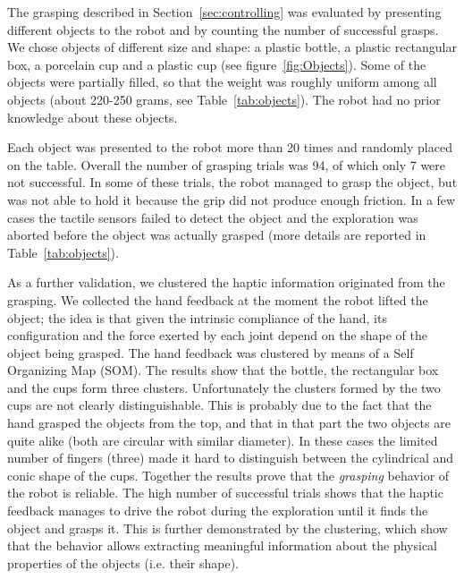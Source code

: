 
The grasping described in Section~\ref{sec:controlling} was
evaluated by presenting different objects to the robot and by
counting the number of successful grasps. We chose objects of
different size and shape: a plastic bottle, a plastic rectangular
box, a porcelain cup and a plastic cup (see
figure~\ref{fig:Objects}). Some of the objects were partially
filled, so that the weight was roughly uniform among all objects
(about 220-250 grams, see Table~\ref{tab:objects}). The robot had
no prior knowledge about these objects.

Each object was presented to the robot more than 20 times and
randomly placed on the table. Overall the number of grasping
trials was 94, of which only 7 were not successful. In some of
these trials, the robot managed to grasp the object, but was not
able to hold it because the grip did not produce enough friction.
In a few cases the tactile sensors failed to detect the object and
the exploration was aborted before the object was actually grasped
(more details are reported in Table~\ref{tab:objects}).

As a further validation, we clustered the haptic information
originated from the grasping. We collected the hand feedback at
the moment the robot lifted the object; the idea is that given the
intrinsic compliance of the hand, its configuration and the force
exerted by each joint depend on the shape of the object being
grasped. The hand feedback was clustered by means of a Self
Organizing Map (SOM). The results show that the bottle, the
rectangular box and the cups form three clusters. Unfortunately
the clusters formed by the two cups are not clearly
distinguishable. This is probably due to the fact that the hand
grasped the objects from the top, and that in that part the two
objects are quite alike (both are circular with similar diameter).
In these cases the limited number of fingers (three) made it hard
to distinguish between the cylindrical and conic shape of the
cups. Together the results prove that the \emph{grasping} behavior
of the robot is reliable. The high number of successful trials
shows that the haptic feedback manages to drive the robot during
the exploration until it finds the object and grasps it. This is
further demonstrated by the clustering, which show that the
behavior allows extracting meaningful information about the
physical properties of the objects (i.e. their shape).


